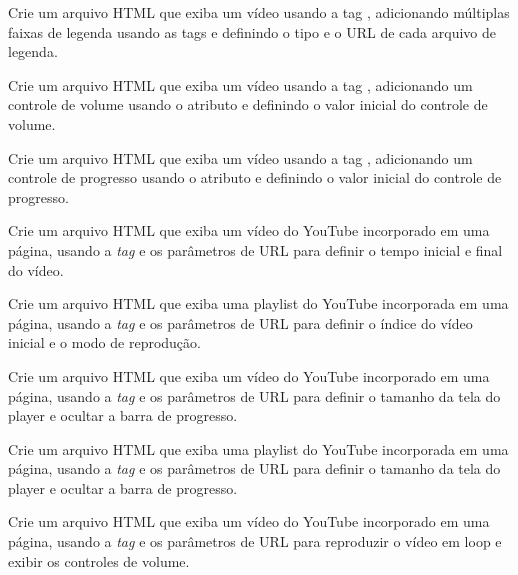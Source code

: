 \begin{exercise}
Crie um arquivo HTML que exiba um vídeo usando a tag , adicionando múltiplas faixas de legenda usando as tags  e definindo o tipo e o URL de cada arquivo de legenda.
\end{exercise}

\begin{exercise}
Crie um arquivo HTML que exiba um vídeo usando a tag , adicionando um controle de volume usando o atributo  e definindo o valor inicial do controle de volume.
\end{exercise}

\begin{exercise}
Crie um arquivo HTML que exiba um vídeo usando a tag , adicionando um controle de progresso usando o atributo  e definindo o valor inicial do controle de progresso.
\end{exercise}

\begin{exercise}
Crie um arquivo HTML que exiba um vídeo do YouTube incorporado em uma página, usando a \textit{tag}  e os parâmetros de URL para definir o tempo inicial e final do vídeo.
\end{exercise}

\begin{exercise}
Crie um arquivo HTML que exiba uma playlist do YouTube incorporada em uma página, usando a \textit{tag}  e os parâmetros de URL para definir o índice do vídeo inicial e o modo de reprodução.
\end{exercise}

\begin{exercise}
Crie um arquivo HTML que exiba um vídeo do YouTube incorporado em uma página, usando a \textit{tag}  e os parâmetros de URL para definir o tamanho da tela do player e ocultar a barra de progresso.
\end{exercise}

\begin{exercise}
Crie um arquivo HTML que exiba uma playlist do YouTube incorporada em uma página, usando a \textit{tag}  e os parâmetros de URL para definir o tamanho da tela do player e ocultar a barra de progresso.
\end{exercise}

\begin{exercise}
Crie um arquivo HTML que exiba um vídeo do YouTube incorporado em uma página, usando a \textit{tag}  e os parâmetros de URL para reproduzir o vídeo em loop e exibir os controles de volume.
\end{exercise}

